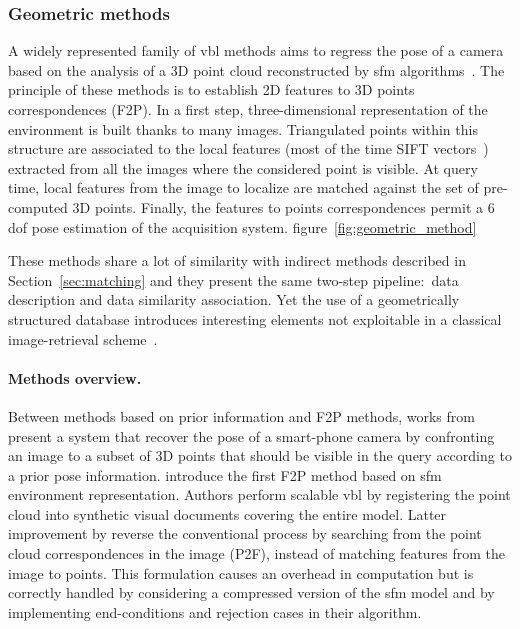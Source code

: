 \subsubsection{Geometric methods}


\label{subsubsec:sfm_methods}
A widely represented family of \ac{vbl} methods aims to regress the pose of a camera based on the analysis of a 3D point cloud reconstructed by \ac{sfm} algorithms~\citep{schoenberger2016sfm,moulon2016openmvg,rupnik2017micmac}. The principle of these methods is to establish 2D features to 3D points correspondences (F2P). In a first step, three-dimensional representation of the environment is built thanks to many images. Triangulated points within this structure are associated to the local features (most of the time SIFT vectors~\citep{Lowe2004}) extracted from all the images where the considered point is visible. At query time, local features from the image to localize are matched against the set of pre-computed 3D points. Finally, the features to points correspondences permit a 6 \ac{dof} pose estimation of the acquisition system. figure~\ref{fig:geometric_method}

These methods share a lot of similarity with indirect methods described in Section~\ref{sec:matching} and they present the same two-step pipeline:~data description and data similarity association. Yet the use of a geometrically structured database introduces interesting elements not exploitable in a classical image-retrieval scheme~\citep{Sattler2012a}.

\paragraph{Methods overview.}
Between methods based on prior information and F2P methods, works from \citet{Arth2009} present a system that recover the pose of a smart-phone camera by confronting an image to a subset of 3D points that should be visible in the query according to a prior pose information. \citet{Irschara2009} introduce the first F2P method based on \ac{sfm} environment representation. Authors perform scalable \ac{vbl} by registering the point cloud into synthetic visual documents covering the entire model. Latter improvement by \citet{Li2010} reverse the conventional process by searching from the point cloud correspondences in the image (P2F), instead of matching features from the image to points. This formulation causes an overhead in computation but is correctly handled by considering a compressed version of the \ac{sfm} model and by implementing end-conditions and rejection cases in their algorithm.

